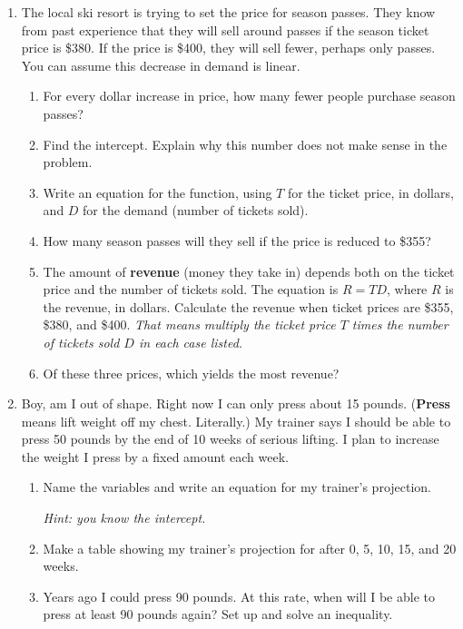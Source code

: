 \begin{enumerate}
\newpage %

\item The local ski resort is trying to set the price for season passes.  They know from past experience that they will sell around  passes if the season ticket price is \$380.  If the price is \$400, they will sell fewer, perhaps only  passes.  You can assume this decrease in demand is linear.
\begin{enumerate}
\item For every dollar increase in price, how many fewer people purchase season passes? \vfill
\item Find the intercept.  Explain why this number does not make sense in the problem. \vfill
\item Write an equation for the function, using $T$ for the ticket price, in dollars, and $D$ for the demand (number of tickets sold). \vfill
\item How many season passes will they sell if the price is reduced to \$355? \vfill
\item The amount of \textbf{revenue} (money they take in) depends both on the ticket price and the number of tickets sold.  The equation is $R = TD$, where $R$ is the revenue, in dollars.  Calculate the revenue when ticket prices are \$355, \$380, and \$400.  \emph{That means multiply the ticket price $T$ times the number of tickets sold $D$ in each case listed.}  
\vfill 
\item Of these three prices, which yields the most revenue? \vfill 
\end{enumerate}

\newpage %

\item Boy, am I out of shape.  Right now I can only press about 15 pounds. (\textbf{Press} means lift weight off my chest.  Literally.)  My trainer says I should be able to press 50 pounds by the end of 10 weeks of serious lifting. I plan to increase the weight I press by a fixed amount each week.
\begin{enumerate}
\item Name the variables and write an equation for my trainer's projection. 
  
 \emph{Hint:  you know the intercept.} \vfill
 \item Make a table showing my trainer's projection for after 0, 5, 10, 15, and 20 weeks.
\vfill
\item Years ago I could press 90 pounds. At this rate, when will I be able to press at least 90 pounds again?  Set up and solve an inequality. \vfill


\end{enumerate}
\end{enumerate}
